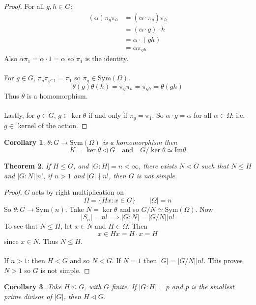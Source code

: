 \documentclass[a4paper,10pt]{article}
\newtheorem{thm}{Theorem}
\newtheorem{Cor}[thm]{Corollary}
\begin{document}
\begin{proof}
For all $g,h \in G$:
\begin{align*}
(\alpha) \pi_g \pi_h &= (\alpha \cdot \pi_g) \pi_h \\
                    &= (\alpha \cdot g) \cdot h \\
                    &= \alpha \cdot (gh) \\
                    &= \alpha \pi_{gh}
\end{align*}
Also $\alpha \pi_1 = \alpha \cdot 1 = \alpha$ so $\pi_1$ is the identity. \\
\\
For $g \in G$, $\pi_g \pi_{g^-1} = \pi_1$ so $\pi_g \in \text{Sym}(\Omega)$. 
\[ \theta(g) \theta(h) = \pi_g \pi_h = \pi_{gh} = \theta(gh) \]
Thus $\theta$ is a homomorphism. \\
\\
Lastly, for $g \in G$, $ g \in \ker \theta$ if and only if $\pi_g = \pi_1$. So $\alpha \cdot g = \alpha$ for all $\alpha \in \Omega$: i.e. $g\in $ kernel of the action. 
\end{proof}

\begin{Cor}
$\theta : G \rightarrow \text{Sym} (\Omega)$ is a homomorphism then
\[ K = \ker \theta \triangleleft G \quad \text{and} \quad G / \ker \theta \simeq \text{Im} \theta \]
\end{Cor}

\begin{thm}
If $H \leq G$, and $|G : H| = n < \infty$, there exists $N \triangleleft G$ such that $N \leq H$ and $|G : N| \big| n!$, if $n > 1$ and $|G| \nmid n!$, then $G$ is not simple.
\end{thm}

\begin{proof}
$G$ acts by right multiplication on 
\[ \Omega = \{ Hx : x \in G \} \qquad |\Omega| = n \]
So $\theta : G \rightarrow \text{Sym}(n)$. Take $N = \ker \theta$ and so $G / N \simeq \text{Sym}(\Omega)$. Now
\[ |S_n| = n! \implies |G : N| = |G / N| \big| n! \]
To see that $N \leq H$, let $x \in N$ and $H \in \Omega$. Then 
\[ x \in Hx = H \cdot x = H \]
since $x \in N$. Thus $N \leq H$. \\
\\
If $n > 1$: then $H < G$ and so $N < G$. If $N = 1$ then $|G| = |G / N| \big| n!$. This proves $N > 1$ so $G$ is not simple.
\end{proof}

\begin{Cor}
Take $H \leq G$, with $G$ finite. If $|G:H| = p$ and p is the smallest prime divisor of $|G|$, then $H \triangleleft G$.
\end{Cor}
\end{document}
